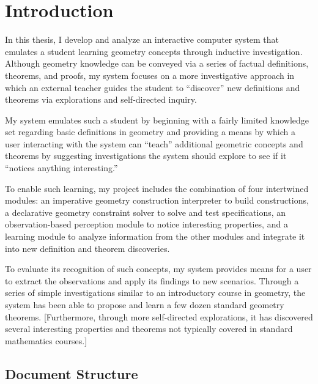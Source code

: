 \chapter{Introduction}
\label{chap:intro}

In this thesis, I develop and analyze an interactive computer system
that emulates a student learning geometry concepts through inductive
investigation. Although geometry knowledge can be conveyed via a
series of factual definitions, theorems, and proofs, my system focuses
on a more investigative approach in which an external teacher guides
the student to ``discover'' new definitions and theorems via
explorations and self-directed inquiry.

My system emulates such a student by beginning with a fairly limited
knowledge set regarding basic definitions in geometry and providing a
means by which a user interacting with the system can ``teach''
additional geometric concepts and theorems by suggesting
investigations the system should explore to see if it ``notices
anything interesting.''

To enable such learning, my project includes the combination of four
intertwined modules: an imperative geometry construction interpreter
to build constructions, a declarative geometry constraint solver to
solve and test specifications, an observation-based perception module
to notice interesting properties, and a learning module to analyze
information from the other modules and integrate it into new
definition and theorem discoveries.

To evaluate its recognition of such concepts, my system provides means
for a user to extract the observations and apply its findings to new
scenarios.  Through a series of simple investigations similar to an
introductory course in geometry, the system has been able to propose
and learn a few dozen standard geometry theorems. [Furthermore, through
more self-directed explorations, it has discovered several interesting
properties and theorems not typically covered in standard mathematics
courses.]

\section{Document Structure}

